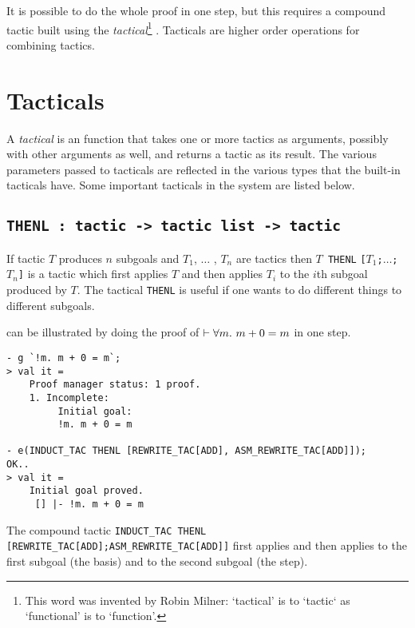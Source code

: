     It is possible to do the whole proof in one step, but this
    requires a compound tactic built using the {\it
      tactical\/}\footnote{This word was invented by Robin Milner:
      `tactical' is to `tactic` as `functional' is to `function'.}
    .  Tacticals are higher order operations for combining
    tactics.

\section{Tacticals}
\label{tacticals}

A {\it tactical\/} is an \ML{} function that takes one or more tactics
as arguments, possibly with other arguments as well, and returns a
tactic as its result.  The various parameters passed to tacticals are
reflected in the various \ML{} types that the built-in tacticals have.
Some important tacticals in the \HOL{} system are listed below.

\subsection{\tt THENL : tactic -> tactic list -> tactic}

If tactic $T$ produces $n$ subgoals and $T_1$, $\ldots$ , $T_n$ are
tactics then $T${\small\verb| THENL|}
{\small\verb|[|}$T_1${\small\verb|;|}$\ldots${\small\verb|;|}$T_n${\small\verb|]|}
is a tactic which first applies $T$ and then applies $T_i$ to the
$i$th subgoal produced by $T$.  The tactical {\small\verb|THENL|} is
useful if one wants to do different things to different subgoals.

 can be illustrated by doing the proof of $\vdash \forall m.\ m+0=m$ in
one step.

\setcounter{sessioncount}{0}
\begin{session}\begin{verbatim}
- g `!m. m + 0 = m`;
> val it =
    Proof manager status: 1 proof.
    1. Incomplete:
         Initial goal:
         !m. m + 0 = m

- e(INDUCT_TAC THENL [REWRITE_TAC[ADD], ASM_REWRITE_TAC[ADD]]);
OK..
> val it =
    Initial goal proved.
     [] |- !m. m + 0 = m
\end{verbatim}\end{session}

\noindent The compound tactic
{\small\verb|INDUCT_TAC THENL [REWRITE_TAC[ADD];ASM_REWRITE_TAC[ADD]]|}
first applies  and then applies
 to the first subgoal (the basis) and
 to the second subgoal (the step).

